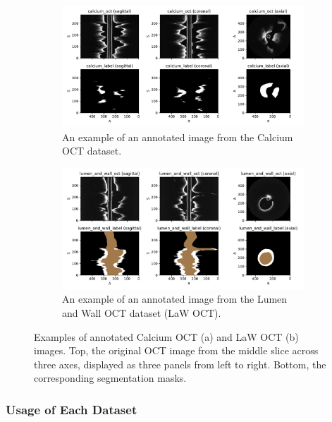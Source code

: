 \documentclass[a4paper,11pt,oneside]{report}
\begin{document}
\begin{figure}[hbt]
    \begin{subfigure}[t]{0.49\textwidth}
        \centering
        \includegraphics[width=1\linewidth]{figures/fig_datasets_calcium_oct_sample.pdf}
        \caption{An example of an annotated image from the Calcium OCT dataset.}
        \label{fig:calcium-oct}
    \end{subfigure}%
    \hfill
    \begin{subfigure}[t]{0.49\textwidth}
        \centering
        \includegraphics[width=1\linewidth]{figures/fig_datasets_law_oct_sample.pdf}
        \caption{An example of an annotated image from the Lumen and Wall OCT dataset (LaW OCT).}
        \label{fig:lumen-and-wall-oct}
    \end{subfigure}
    \caption{Examples of annotated Calcium OCT (a) and LaW OCT (b) images. Top, the original OCT image from the middle slice across three axes, displayed as three panels from left to right. Bottom, the corresponding segmentation masks.}
    \label{fig:annotated-oct}
\end{figure}

\subsubsection{Usage of Each Dataset}
\end{document}
